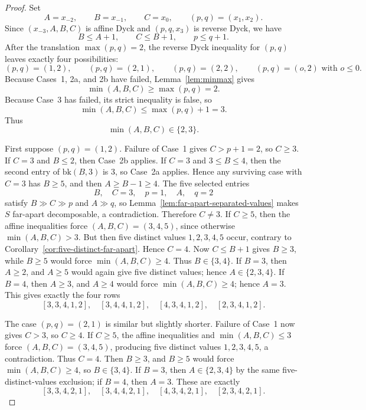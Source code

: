 \documentclass[11pt]{article}
\theoremstyle{plain}
\theoremstyle{definition}
\theoremstyle{remark}
\begin{document}
\begin{proof}
Set
\[
  A=x_{-2},\qquad B=x_{-1},\qquad C=x_0,
  \qquad (p,q)=(x_1,x_2).
\]
Since \((x_{-3},A,B,C)\) is affine Dyck and \((p,q,x_3)\) is reverse Dyck, we
have
\[
  B\le A+1,
  \qquad C\le B+1,
  \qquad p\le q+1.
\]
After the translation \(\max(p,q)=2\), the reverse Dyck inequality for
\((p,q)\) leaves exactly four possibilities:
\[
  (p,q)=(1,2),\qquad (p,q)=(2,1),\qquad (p,q)=(2,2),
  \qquad (p,q)=(o,2)\text{ with }o\le 0.
\]
Because Cases~1, 2a, and 2b have failed, Lemma~\ref{lem:minmax} gives
\[
  \min(A,B,C)\ge \max(p,q)=2.
\]
Because Case~3 has failed, its strict inequality is false, so
\[
  \min(A,B,C)\le \max(p,q)+1=3.
\]
Thus
\[
  \min(A,B,C)\in\{2,3\}.
\]

First suppose \((p,q)=(1,2)\). Failure of Case~1 gives \(C>p+1=2\), so
\(C\ge 3\). If \(C=3\) and \(B\le 2\), then Case~2b applies. If \(C=3\) and
\(3\le B\le 4\), then the second entry of \(\mathrm{bk}(B,3)\) is \(3\), so
Case~2a applies. Hence any surviving case with \(C=3\) has \(B\ge 5\), and
then \(A\ge B-1\ge 4\). The five selected entries
\[
  B,\quad C=3,\quad p=1,\quad A,\quad q=2
\]
satisfy \(B\gg C\gg p\) and \(A\gg q\), so
Lemma~\ref{lem:far-apart-separated-values} makes \(S\) far-apart
decomposable, a contradiction. Therefore \(C\ne 3\). If \(C\ge 5\), then the
affine inequalities force \((A,B,C)=(3,4,5)\), since otherwise
\(\min(A,B,C)>3\). But then five distinct values \(1,2,3,4,5\) occur, contrary
to Corollary~\ref{cor:five-distinct-far-apart}. Hence \(C=4\). Now
\(C\le B+1\) gives \(B\ge 3\), while \(B\ge 5\) would force
\(\min(A,B,C)\ge 4\). Thus \(B\in\{3,4\}\). If \(B=3\), then
\(A\ge 2\), and \(A\ge 5\) would again give five distinct values; hence
\(A\in\{2,3,4\}\). If \(B=4\), then \(A\ge 3\), and \(A\ge 4\) would force
\(\min(A,B,C)\ge 4\); hence \(A=3\). This gives exactly the four rows
\[
  [3,3,4,1,2],\quad [3,4,4,1,2],\quad [4,3,4,1,2],\quad [2,3,4,1,2].
\]

The case \((p,q)=(2,1)\) is similar but slightly shorter. Failure of Case~1
now gives \(C>3\), so \(C\ge 4\). If \(C\ge 5\), the affine inequalities and
\(\min(A,B,C)\le 3\) force \((A,B,C)=(3,4,5)\), producing five distinct values
\(1,2,3,4,5\), a contradiction. Thus \(C=4\). Then \(B\ge 3\), and
\(B\ge 5\) would force \(\min(A,B,C)\ge 4\), so \(B\in\{3,4\}\). If
\(B=3\), then \(A\in\{2,3,4\}\) by the same five-distinct-values exclusion;
if \(B=4\), then \(A=3\). These are exactly
\[
  [3,3,4,2,1],\quad [3,4,4,2,1],\quad [4,3,4,2,1],\quad [2,3,4,2,1].
\]


\end{proof}
\end{document}
